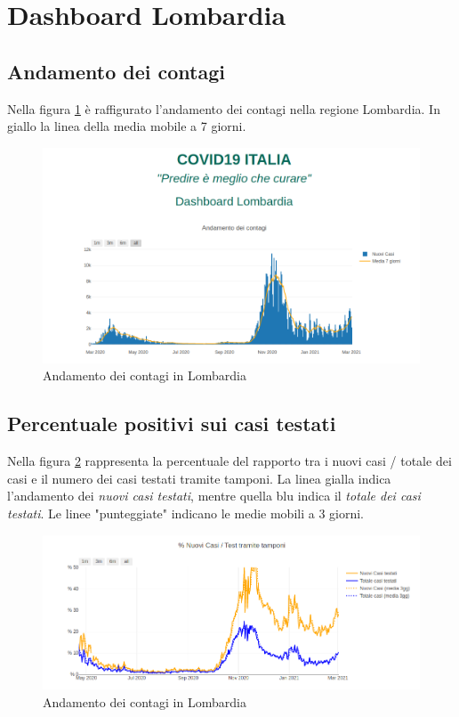 \section{Dashboard Lombardia}
\subsection{Andamento dei contagi}
Nella figura \ref{fig:andamento_lomb} è raffigurato l'andamento dei contagi nella regione Lombardia.
In giallo la linea della media mobile a 7 giorni.
\begin{figure}[htp]
    \centering
    \includegraphics[width=12cm]{img/lomb/andamento_lomb.png}
    \caption{Andamento dei contagi in Lombardia}
    \label{fig:andamento_lomb}
\end{figure}

\subsection{Percentuale positivi sui casi testati}
Nella figura \ref{fig:positivi_testati_lomb} rappresenta la percentuale del rapporto tra i nuovi casi / totale dei casi e il numero dei casi testati tramite tamponi.
La linea gialla indica l'andamento dei \emph{nuovi casi testati}, mentre quella blu indica il \emph{totale dei casi testati}.
Le linee "punteggiate" indicano le medie mobili a 3 giorni.
\begin{figure}[htp]
    \centering
    \includegraphics[width=12cm]{img/lomb/casi_tamp_lomb.png}
    \caption{Andamento dei contagi in Lombardia}
    \label{fig:positivi_testati_lomb}
\end{figure}

